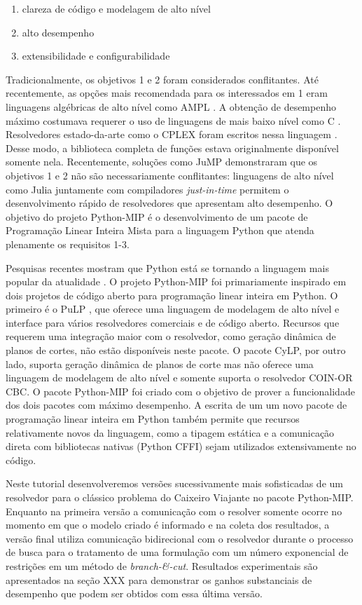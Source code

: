 \documentclass[a4paper,11pt,fleqn]{article}
\begin{document}
\begin{enumerate}
	\item clareza de código e modelagem de alto nível
	\item alto desempenho
	\item extensibilidade e configurabilidade
\end{enumerate}

Tradicionalmente, os objetivos 1 e 2 foram considerados conflitantes.
Até recentemente, as opções mais recomendada para os interessados
em 1 eram linguagens algébricas de alto nível como AMPL \citep{Fourer1987}.
A obtenção de desempenho máximo costumava requerer o uso de linguagens
de mais baixo nível como C \citep{Johnson1991a}. Resolvedores estado-da-arte
como o CPLEX foram escritos nessa linguagem \citep{Bixby2002}. Desse
modo, a biblioteca completa de funções estava originalmente 
disponível somente nela. Recentemente, soluções como JuMP\citep{Dunning2015}
demonstraram que os objetivos 1 e 2 não são necessariamente conflitantes:
linguagens de alto nível como Julia juntamente com compiladores \emph{just-in-time}
permitem o desenvolvimento rápido de resolvedores que apresentam alto
desempenho. O objetivo do projeto Python-MIP é o desenvolvimento de
um pacote de Programação Linear Inteira Mista para a linguagem Python
que atenda plenamente os requisitos 1-3.

Pesquisas recentes mostram que Python está se tornando a linguagem
mais popular da atualidade \citep{pythonEconomist2018}. O projeto Python-MIP foi primariamente inspirado em dois projetos de código aberto para programação linear inteira em Python. O primeiro é o PuLP \citep{Mitchell2009}, que oferece uma linguagem de modelagem de alto nível e interface para vários resolvedores comerciais e de código aberto. Recursos que requerem uma integração maior com o resolvedor, como geração dinâmica de planos de cortes, não estão
disponíveis neste pacote. O pacote CyLP, por outro lado, suporta geração dinâmica de planos de corte mas não oferece uma linguagem de modelagem de alto nível\citep{Towhidi2016} e somente suporta o resolvedor COIN-OR CBC\citep{Forrest2005}. O pacote Python-MIP foi criado com o objetivo de prover a funcionalidade dos dois pacotes com máximo desempenho. A escrita de um um novo pacote de programação linear inteira em Python
também permite que recursos relativamente novos da linguagem, como
a tipagem estática e a comunicação direta com bibliotecas nativas
(Python CFFI) sejam utilizados extensivamente no código.

Neste tutorial desenvolveremos versões sucessivamente mais sofisticadas
de um resolvedor para o clássico problema do Caixeiro Viajante \citep{Dantzig54,Miller1960,Applegate2006} no
pacote Python-MIP. Enquanto na primeira versão a comunicação com o resolver 
somente ocorre no momento em que o modelo criado é informado e na coleta dos resultados, 
a versão final utiliza comunicação bidirecional com o resolvedor durante o processo de busca para o tratamento
de uma formulação com um número exponencial de restrições em um método de \emph{branch-\&-cut}. Resultados experimentais são apresentados na seção XXX 
para demonstrar os ganhos substanciais de desempenho que podem ser obtidos com essa última versão.
\end{document}
